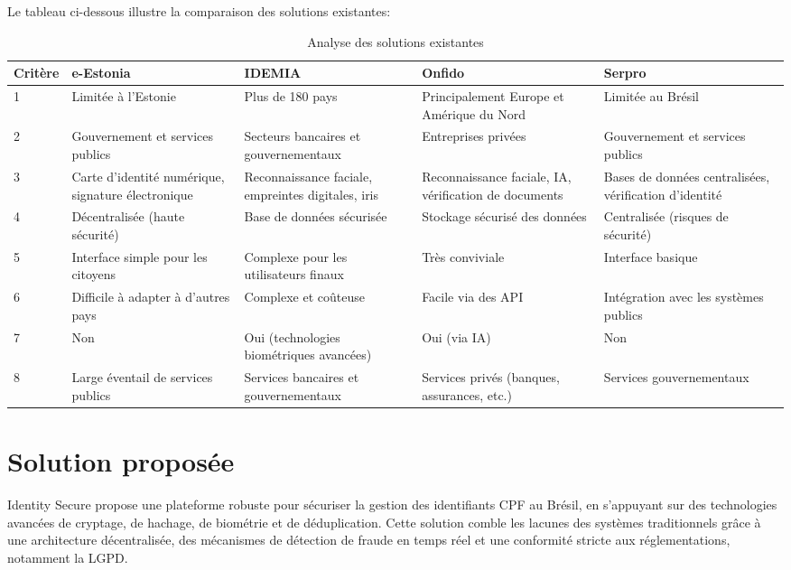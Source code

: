 Le tableau ci-dessous illustre la comparaison des solutions existantes:

\begin{table}[H]
\centering
\caption{\centering Analyse des solutions existantes}
\label{tab:analyse-solutions}
\begin{tabular}{|p{1.8cm}|p{3cm}|p{3cm}|p{3cm}|p{3cm}|}
\hline
\rowcolor{gray!30} %
\textbf{Critère} & \textbf{e-Estonia} & \textbf{IDEMIA} & \textbf{Onfido} & \textbf{Serpro} \\
\hline
1 & Limitée à l'Estonie & Plus de 180 pays & Principalement Europe et Amérique du Nord & Limitée au Brésil \\
\hline
2 & Gouvernement et services publics & Secteurs bancaires et gouvernementaux & Entreprises privées & Gouvernement et services publics \\
\hline
3 & Carte d'identité numérique, signature électronique & Reconnaissance faciale, empreintes digitales, iris & Reconnaissance faciale, IA, vérification de documents & Bases de données centralisées, vérification d'identité \\
\hline
4 & Décentralisée (haute sécurité) & Base de données sécurisée & Stockage sécurisé des données & Centralisée (risques de sécurité) \\
\hline
5 & Interface simple pour les citoyens & Complexe pour les utilisateurs finaux & Très conviviale & Interface basique \\
\hline
6 & Difficile à adapter à d'autres pays & Complexe et coûteuse & Facile via des API & Intégration avec les systèmes publics \\
\hline
7 & Non & Oui (technologies biométriques avancées) & Oui (via IA) & Non \\
\hline
8 & Large éventail de services publics & Services bancaires et gouvernementaux & Services privés (banques, assurances, etc.) & Services gouvernementaux \\
\hline
\end{tabular}
\end{table}


\section{Solution proposée}
Identity Secure propose une plateforme robuste pour sécuriser la gestion des identifiants CPF au Brésil, en s'appuyant sur des technologies avancées de cryptage, de hachage, de biométrie et de déduplication. Cette solution comble les lacunes des systèmes traditionnels grâce à une architecture décentralisée, des mécanismes de détection de fraude en temps réel et une conformité stricte aux réglementations, notamment la LGPD.


